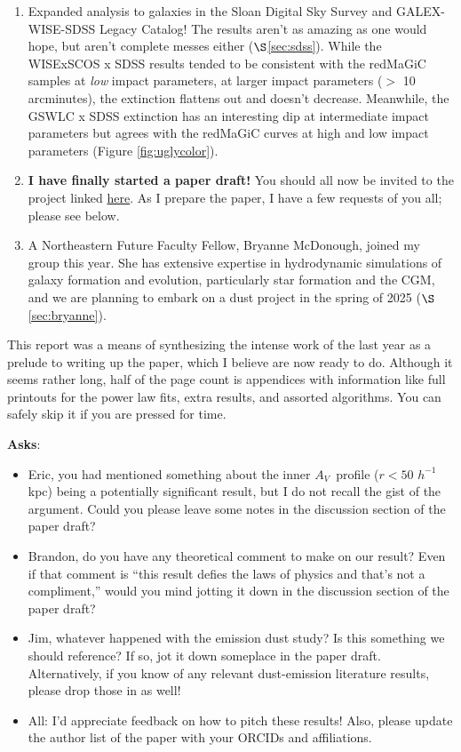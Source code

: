 \documentclass[11pt, oneside]{article}   	%
\newcommand{\av}{$A_V$~}
\newcommand{\hinv}{$h^{-1}$\xspace}
\begin{document}
\begin{enumerate}
	\item Expanded analysis to galaxies in the Sloan Digital Sky Survey and GALEX-WISE-SDSS Legacy Catalog! The results aren't as amazing as one would hope, but aren't complete messes either ($\S$\ref{sec:sdss}). While the WISExSCOS x SDSS results tended to be consistent with the redMaGiC samples at \textit{low} impact parameters, at larger impact parameters ($>$ 10 arcminutes), the extinction flattens out and doesn't decrease. Meanwhile, the GSWLC x SDSS extinction has an interesting dip at intermediate impact parameters but agrees with the redMaGiC curves at high and low impact parameters (Figure \ref{fig:uglycolor}).
	\item \textbf{I have finally started a paper draft!} You should all now be invited to the project linked \href{https://www.overleaf.com/project/67627b2dec68007293195d47}{here}. As I prepare the paper, I have a few requests of you all; please see below. 
	\item A Northeastern Future Faculty Fellow, Bryanne McDonough, joined my group this year. She has extensive expertise in hydrodynamic simulations of galaxy formation and evolution, particularly star formation and the CGM, and we are planning to embark on a dust project in the spring of 2025 ($\S$\ref{sec:bryanne}).  
\end{enumerate}

This report was a means of synthesizing the intense work of the last year as a prelude to writing up the paper, which I believe are now ready to do. Although it seems rather long, half of the page count is appendices with information like full printouts for the power law fits, extra results, and assorted algorithms. You can safely skip it if you are pressed for time. 

\textbf{Asks}: 
\begin{itemize}
\item Eric, you had mentioned something about the inner \av profile ($r < 50$ \hinv kpc) being a potentially significant result, but I do not recall the gist of the argument. Could you please leave some notes in the discussion section of the paper draft? 
\item Brandon, do you have any theoretical comment to make on our result? Even if that comment is ``this result defies the laws of physics and that's not a compliment,'' would you mind jotting it down in the discussion section of the paper draft? 
\item Jim, whatever happened with the emission dust study? Is this something we should reference? If so, jot it down someplace in the paper draft. Alternatively, if you know of any relevant dust-emission literature results, please drop those in as well!   
\item All: I'd appreciate feedback on how to pitch these results! Also, please update the author list of the paper with your ORCIDs and affiliations.
\end{itemize}
\end{document}
